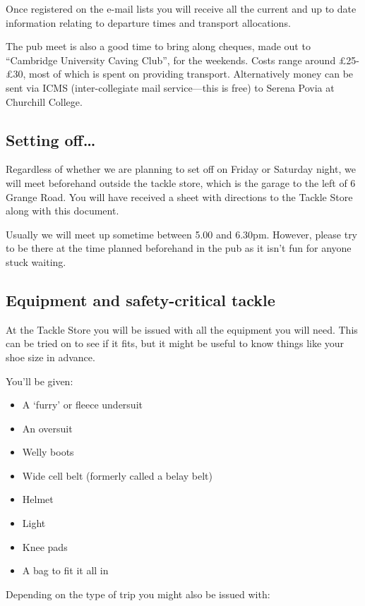 \documentclass[a4paper,11pt]{article}
\begin{document}
Once registered on the e-mail lists you will receive all the current and up to
date information relating to departure times and transport allocations.

The pub meet is also a good time to bring along cheques, made out to
``Cambridge University Caving Club'',  for the weekends.  Costs range around
\pounds 25-\pounds 30, most of which is spent on providing transport.
Alternatively money can be sent via ICMS (inter-collegiate mail service---this
is free) to Serena Povia at Churchill College.

\newpage
\subsection*{Setting off\ldots}

Regardless of whether we are planning to set off on Friday or Saturday night,
we will meet beforehand outside the tackle store, which is the garage to the left of 6 Grange Road. You will have received a sheet with directions to the Tackle Store along with this document.

Usually we will meet up sometime between 5.00 and 6.30pm.  However, please try
to be there at the time planned beforehand in the pub as it isn't fun for
anyone stuck waiting.

\subsection*{Equipment and safety-critical tackle}

At the Tackle Store you will be issued with all the equipment you will need.
This can be tried on to see if it fits, but it might be useful to know things
like your shoe size in advance.

You'll be given:

\begin{itemize}
\item A `furry' or fleece undersuit
\item An oversuit
\item Welly boots
\item Wide cell belt (formerly called a belay belt)
\item Helmet
\item Light
\item Knee pads
\item A bag to fit it all in
\end{itemize}

Depending on the type of trip you might also be issued with:
\end{document}
